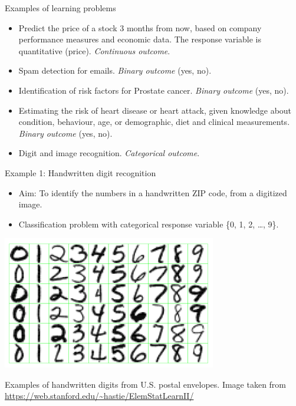 \documentclass[
  ignorenonframetext,
]{beamer}
\providecommand{\tightlist}{%
  \setlength{\itemsep}{0pt}\setlength{\parskip}{0pt}}
\begin{document}
\begin{frame}{Examples of learning problems}
\protect\hypertarget{examples-of-learning-problems}{}
\begin{itemize}
\item
  Predict the price of a stock 3 months from now, based on company
  performance measures and economic data. The response variable is
  quantitative (price). \emph{Continuous outcome}.
\item
  Spam detection for emails. \emph{Binary outcome} (yes, no).
\item
  Identification of risk factors for Prostate cancer. \emph{Binary
  outcome} (yes, no).
\item
  Estimating the risk of heart disease or heart attack, given knowledge
  about condition, behaviour, age, or demographic, diet and clinical
  measurements. \emph{Binary outcome} (yes, no).
\item
  Digit and image recognition. \emph{Categorical outcome}.
\end{itemize}
\end{frame}

\begin{frame}
\begin{block}{Example 1: Handwritten digit recognition}
\protect\hypertarget{example-1-handwritten-digit-recognition}{}
\begin{itemize}
\tightlist
\item
  Aim: To identify the numbers in a handwritten ZIP code, from a
  digitized image.
\item
  Classification problem with categorical response variable \{0, 1, 2,
  \ldots, 9\}. \vspace{1mm}
\end{itemize}

\centering

\includegraphics[width=0.7\textwidth,height=\textheight]{digits.png}
\vspace{1mm}

\flushleft

Examples of handwritten digits from U.S. postal envelopes. \scriptsize
Image taken from \url{https://web.stanford.edu/~hastie/ElemStatLearnII/}
\end{block}
\end{frame}
\end{document}
